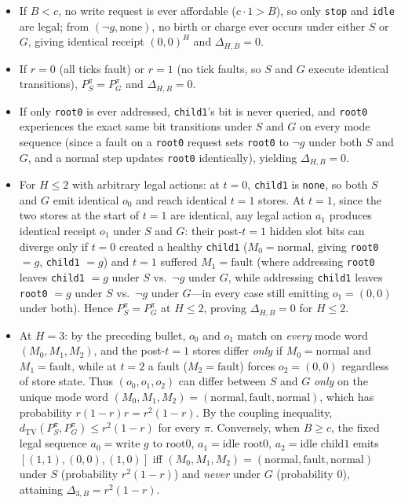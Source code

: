\documentclass[11pt,a4paper]{article}
\newcounter{none}
\providecommand{\tightlist}{\setlength{\itemsep}{2pt}\setlength{\parskip}{0pt}}
\begin{document}
\begin{itemize}
\tightlist
\item
  If \(B < c\), no write request is ever affordable (\(c \cdot 1 > B\)),
  so only \texttt{stop} and \texttt{idle} are legal; from
  \((\neg g, \mathrm{none})\), no birth or charge ever occurs under
  either \(S\) or \(G\), giving identical receipt \((0,0)^H\) and
  \(\Delta_{H,B} = 0\).
\item
  If \(r = 0\) (all ticks fault) or \(r = 1\) (no tick faults, so \(S\)
  and \(G\) execute identical transitions), \(P_S^\pi = P_G^\pi\) and
  \(\Delta_{H,B} = 0\).
\item
  If only \texttt{root0} is ever addressed, \texttt{child1}'s bit is
  never queried, and \texttt{root0} experiences the exact same bit
  transitions under \(S\) and \(G\) on every mode sequence (since a
  fault on a \texttt{root0} request sets \texttt{root0} to \(\neg g\)
  under both \(S\) and \(G\), and a normal step updates \texttt{root0}
  identically), yielding \(\Delta_{H,B} = 0\).
\item
  For \(H \le 2\) with arbitrary legal actions: at \(t = 0\),
  \texttt{child1} is \texttt{none}, so both \(S\) and \(G\) emit
  identical \(o_0\) and reach identical \(t=1\) stores. At \(t = 1\),
  since the two stores at the start of \(t=1\) are identical, any legal
  action \(a_1\) produces identical receipt \(o_1\) under \(S\) and
  \(G\): their post-\(t=1\) hidden slot bits can diverge only if \(t=0\)
  created a healthy \texttt{child1} (\(M_0 = \mathrm{normal}\), giving
  \texttt{root0} \(=g\), \texttt{child1} \(=g\)) and \(t=1\) suffered
  \(M_1 = \mathrm{fault}\) (where addressing \texttt{root0} leaves
  \texttt{child1} \(=g\) under \(S\) vs.~\(\neg g\) under \(G\), while
  addressing \texttt{child1} leaves \texttt{root0} \(=g\) under \(S\)
  vs.~\(\neg g\) under \(G\)---in every case still emitting
  \(o_1 = (0,0)\) under both). Hence \(P_S^\pi = P_G^\pi\) at
  \(H \le 2\), proving \(\Delta_{H,B} = 0\) for \(H \le 2\).
\item
  At \(H = 3\): by the preceding bullet, \(o_0\) and \(o_1\) match on
  \emph{every} mode word \((M_0, M_1, M_2)\), and the post-\(t=1\)
  stores differ \emph{only} if \(M_0 = \mathrm{normal}\) and
  \(M_1 = \mathrm{fault}\), while at \(t=2\) a fault
  (\(M_2 = \mathrm{fault}\)) forces \(o_2 = (0,0)\) regardless of store
  state. Thus \((o_0, o_1, o_2)\) can differ between \(S\) and \(G\)
  \emph{only} on the unique mode word
  \((M_0, M_1, M_2) = (\mathrm{normal}, \mathrm{fault}, \mathrm{normal})\),
  which has probability \(r(1-r)r = r^2(1-r)\). By the coupling
  inequality, \(d_{\mathrm{TV}}(P_S^\pi, P_G^\pi) \le r^2(1-r)\) for
  every \(\pi\). Conversely, when \(B \ge c\), the fixed legal sequence
  \(a_0 = \text{write }g\text{ to root0}\), \(a_1 = \text{idle root0}\),
  \(a_2 = \text{idle child1}\) emits \([(1,1), (0,0), (1,0)]\) iff
  \((M_0, M_1, M_2) = (\mathrm{normal}, \mathrm{fault}, \mathrm{normal})\)
  under \(S\) (probability \(r^2(1-r)\)) and \emph{never} under \(G\)
  (probability \(0\)), attaining \(\Delta_{3,B} = r^2(1-r)\).
\end{itemize}
\end{document}
